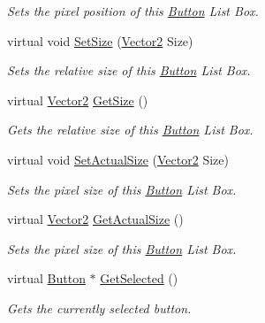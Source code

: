 \begin{DoxyCompactItemize}
\begin{DoxyCompactList}\small\item\em Sets the pixel position of this \hyperlink{classphys_1_1UI_1_1Button}{Button} List Box. \item\end{DoxyCompactList}\item 
virtual void \hyperlink{classphys_1_1UI_1_1ButtonListBox_a527f2c332225a04e147264dd80e4a6c1}{SetSize} (\hyperlink{classphys_1_1Vector2}{Vector2} Size)
\begin{DoxyCompactList}\small\item\em Sets the relative size of this \hyperlink{classphys_1_1UI_1_1Button}{Button} List Box. \item\end{DoxyCompactList}\item 
virtual \hyperlink{classphys_1_1Vector2}{Vector2} \hyperlink{classphys_1_1UI_1_1ButtonListBox_a0084510b0b9c53761e5b4a45f65604ab}{GetSize} ()
\begin{DoxyCompactList}\small\item\em Gets the relative size of this \hyperlink{classphys_1_1UI_1_1Button}{Button} List Box. \item\end{DoxyCompactList}\item 
virtual void \hyperlink{classphys_1_1UI_1_1ButtonListBox_affb1419eac8fd0818c6afabf4ee21065}{SetActualSize} (\hyperlink{classphys_1_1Vector2}{Vector2} Size)
\begin{DoxyCompactList}\small\item\em Sets the pixel size of this \hyperlink{classphys_1_1UI_1_1Button}{Button} List Box. \item\end{DoxyCompactList}\item 
virtual \hyperlink{classphys_1_1Vector2}{Vector2} \hyperlink{classphys_1_1UI_1_1ButtonListBox_a77d992f8858bf9b9eeb190dd1ea8a4fd}{GetActualSize} ()
\begin{DoxyCompactList}\small\item\em Sets the pixel size of this \hyperlink{classphys_1_1UI_1_1Button}{Button} List Box. \item\end{DoxyCompactList}\item 
virtual \hyperlink{classphys_1_1UI_1_1Button}{Button} $\ast$ \hyperlink{classphys_1_1UI_1_1ButtonListBox_a2774799b087576f9085c0d713c129e76}{GetSelected} ()
\begin{DoxyCompactList}\small\item\em Gets the currently selected button. \item\end{DoxyCompactList}\item 

\end{DoxyCompactItemize}
